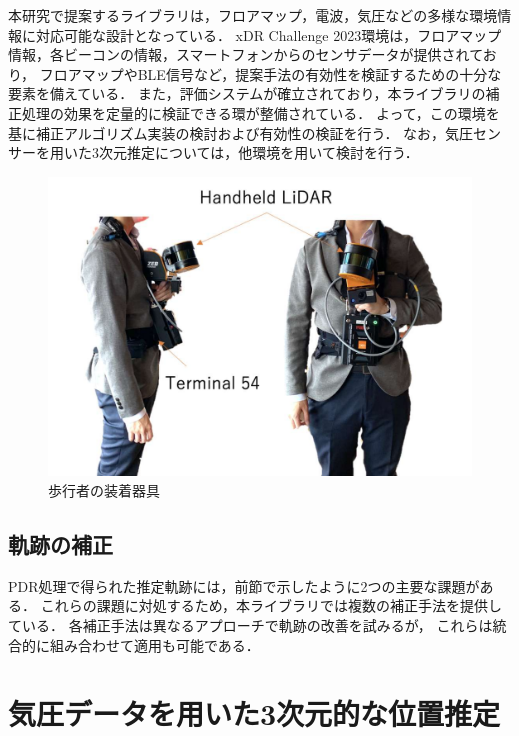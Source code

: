 本研究で提案するライブラリは，フロアマップ，電波，気圧などの多様な環境情報に対応可能な設計となっている．
xDR Challenge 2023環境は，フロアマップ情報，各ビーコンの情報，スマートフォンからのセンサデータが提供されており，
フロアマップやBLE信号など，提案手法の有効性を検証するための十分な要素を備えている．
また，評価システムが確立されており，本ライブラリの補正処理の効果を定量的に検証できる環が整備されている．
よって，この環境を基に補正アルゴリズム実装の検討および有効性の検証を行う．
なお，気圧センサーを用いた3次元推定については，他環境を用いて検討を行う．

\begin{figure}[ht]
	\centering
	\includegraphics[width=\linewidth]{../image/lidar.pdf}
	\caption{歩行者の装着器具}    \label{fig:device}
\end{figure}






\subsection{軌跡の補正}

PDR処理で得られた推定軌跡には，前節で示したように2つの主要な課題がある．
これらの課題に対処するため，本ライブラリでは複数の補正手法を提供している．
各補正手法は異なるアプローチで軌跡の改善を試みるが，
これらは統合的に組み合わせて適用も可能である．








\section{気圧データを用いた3次元的な位置推定}



